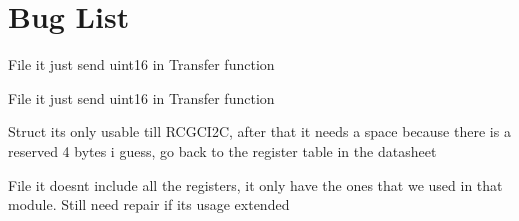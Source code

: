 \chapter{Bug List}
\hypertarget{bug}{}\label{bug}

\begin{DoxyRefList}
\item[File \doxylink{SPI_8c}{SPI.c} ]\label{bug__bug000001}%
%
it just send uint16 in Transfer function  
\item[File \doxylink{SPI_8h}{SPI.h} ]\label{bug__bug000002}%
%
it just send uint16 in Transfer function  
\item[Struct \doxylink{structSysCtl__Module__regs}{Sys\+Ctl\+\_\+\+Module\+\_\+regs} ]\label{bug__bug000004}%
%
it\textquotesingle{}s only usable till RCGCI2C, after that it needs a space because there is a reserved 4 bytes i guess, go back to the register table in the datasheet 


\item[File \doxylink{SysCtl__Registers_8h}{Sys\+Ctl\+\_\+\+Registers.h} ]\label{bug__bug000003}%
%
it doesn\textquotesingle{}t include all the registers, it only have the ones that we used in that module. Still need repair if it\textquotesingle{}s usage extended 
\end{DoxyRefList}